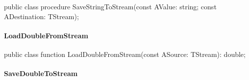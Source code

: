 \documentclass{report}
\newif\ifpdf
\begin{document}
\label{PasDoc_Serialize.TSerializable-SaveStringToStream}
\begin{list}{}{
\setlength{\itemindent}{0cm}
\setlength{\listparindent}{0cm}
\setlength{\leftmargin}{\evensidemargin}
\addtolength{\leftmargin}{\tmplength}
\settowidth{\labelsep}{X}
\addtolength{\leftmargin}{\labelsep}
\setlength{\labelwidth}{\tmplength}
}
\item[\textbf{Declaration}\hfill]
\ifpdf
\begin{flushleft}
\fi
\begin{ttfamily}
public class procedure SaveStringToStream(const AValue: string; const ADestination: TStream);\end{ttfamily}

\ifpdf
\end{flushleft}
\fi

\end{list}
\paragraph*{LoadDoubleFromStream}\hspace*{\fill}

\label{PasDoc_Serialize.TSerializable-LoadDoubleFromStream}
\begin{list}{}{
\setlength{\itemindent}{0cm}
\setlength{\listparindent}{0cm}
\setlength{\leftmargin}{\evensidemargin}
\addtolength{\leftmargin}{\tmplength}
\settowidth{\labelsep}{X}
\addtolength{\leftmargin}{\labelsep}
\setlength{\labelwidth}{\tmplength}
}
\item[\textbf{Declaration}\hfill]
\ifpdf
\begin{flushleft}
\fi
\begin{ttfamily}
public class function LoadDoubleFromStream(const ASource: TStream): double;\end{ttfamily}

\ifpdf
\end{flushleft}
\fi

\end{list}
\paragraph*{SaveDoubleToStream}\hspace*{\fill}
\end{document}
